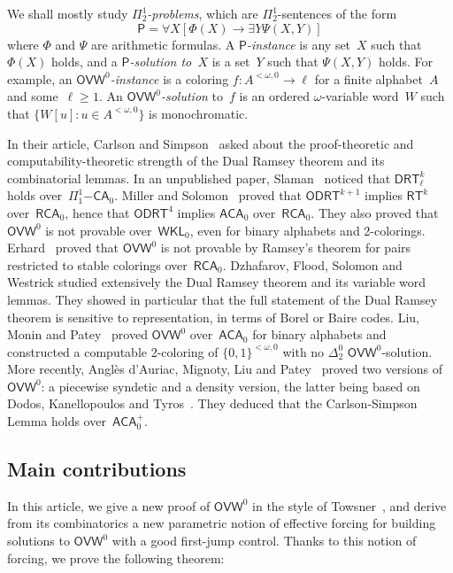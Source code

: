 \documentclass{article}
\newcommand{\Psf}{\mathsf{P}}
\newcommand{\RCA}[0]{\mathsf{RCA}}
\newcommand{\WKL}[0]{\mathsf{WKL}}
\newcommand{\ACA}[0]{\mathsf{ACA}}
\newcommand{\PIOOCA}[0]{\Pi^1_1\mathsf{-CA}}
\newcommand{\RT}[0]{\mathsf{RT}}
\newcommand{\OVW}[0]{\mathsf{OVW}}
\newcommand{\DRT}[0]{\mathsf{DRT}}
\newcommand{\ODRT}[0]{\mathsf{ODRT}}
\numberwithin{theorem}{section}
\theoremstyle{definition}
\begin{document}
\noindent
We shall mostly study \emph{$\Pi^1_2$-problems}, which are $\Pi^1_2$-sentences of the form
$$
\Psf = \forall X[\Phi(X) \to \exists Y \Psi(X,Y)]
$$
where $\Phi$ and $\Psi$ are arithmetic formulas. A \emph{$\Psf$-instance} is any set~$X$ such that $\Phi(X)$ holds,
and a \emph{$\Psf$-solution to~$X$} is a set~$Y$ such that $\Psi(X,Y)$ holds. For example, an \emph{$\OVW^0$-instance} is a coloring $f : A^{<\omega, 0} \to \ell$ for a finite alphabet~$A$ and some~$\ell \geq 1$. An \emph{$\OVW^0$-solution} to~$f$ is an ordered $\omega$-variable word~$W$ such that $\{ W[u] : u \in A^{<\omega,0} \}$ is monochromatic.
\smallskip

In their article, Carlson and Simpson~\cite{carlson1984dual} asked about the proof-theoretic and computability-theoretic strength of the Dual Ramsey theorem and its combinatorial lemmas. In an unpublished paper, Slaman~\cite{slamanNoteDualRamsey1997} noticed that $\DRT^k_\ell$ holds over~$\PIOOCA_0$. Miller and Solomon~\cite{miller2004effectiveness} proved that $\ODRT^{k+1}$ implies $\RT^k$ over~$\RCA_0$, hence that $\ODRT^4$ implies $\ACA_0$ over~$\RCA_0$. They also proved that $\OVW^0$ is not provable over~$\WKL_0$, even for binary alphabets and 2-colorings. Erhard~\cite{erhard2013carlson} proved that $\OVW^0$ is not provable by Ramsey's theorem for pairs restricted to stable colorings over~$\RCA_0$. Dzhafarov, Flood, Solomon and Westrick \cite{dzhafarov2021effectiveness} studied extensively the Dual Ramsey theorem and its variable word lemmas.
They showed in particular that the full statement of the Dual Ramsey theorem is sensitive to representation, in terms of Borel or Baire codes. Liu, Monin and Patey~\cite{liu2019computable} proved $\OVW^0$ over~$\ACA_0$ for binary alphabets and constructed a computable 2-coloring of $\{0,1\}^{<\omega,0}$ with no $\Delta^0_2$ $\OVW^0$-solution. More recently, Anglès d’Auriac, Mignoty, Liu and Patey~\cite{angles2023carlson} proved two versions of $\OVW^0$: a piecewise syndetic and a density version, the latter being based on Dodos, Kanellopoulos and Tyros~\cite{dodos2014density}. They deduced that the Carlson-Simpson Lemma holds over~$\ACA_0^+$.

\subsection{Main contributions}

In this article, we give a new proof of $\OVW^0$ in the style of Towsner~\cite{towsner2012simple}, and derive from its combinatorics a new parametric notion of effective forcing for building solutions to $\OVW^0$ with a good first-jump control. Thanks to this notion of forcing, we prove the following theorem:
\end{document}
